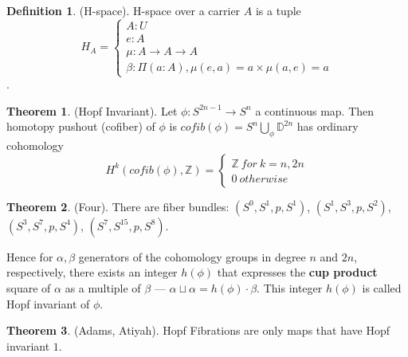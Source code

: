 \documentclass{article}
\theoremstyle{definition}
\newtheorem{definition}{Definition}
\newtheorem{theorem}{Theorem}
\begin{document}
\begin{definition} (H-space).
H-space over a carrier $A$ is a tuple
$$
H_A=
\begin{cases}
A : U\\
e : A\\
\mu : A \rightarrow A \rightarrow A\\
\beta : \Pi (a:A), \mu(e,a)=a \times \mu(a,e)=a
\end{cases}
$$.
\end{definition}

\newpage
\begin{theorem} (Hopf Invariant).
Let $\phi: S^{2n-1} \rightarrow S^{n}$ a continuous map.
Then homotopy pushout (cofiber) of $\phi$ is
$cofib(\phi) = S^{n} \bigcup_\phi \mathbb{D}^{2n}$ has
ordinary cohomology
$$
H^{k}(cofib(\phi),\mathbb{Z})=
\begin{cases}
\mathbb{Z}\ for\ k=n,2n \\[2ex]
0\ otherwise
\end{cases}
$$
\end{theorem}


\begin{theorem} (Four).
There are fiber bundles:
$(S^0,S^1,p,S^1)$,
$(S^1,S^3,p,S^2)$,
$(S^3,S^7,p,S^4)$,
$(S^7,S^{15},p,S^8)$.
\end{theorem}

Hence for $\alpha,\beta$ generators of the cohomology groups in
degree $n$ and $2n$, respectively, there exists an integer $h(\phi)$
that expresses the {\textbf{cup product}} square of $\alpha$
as a multiple of $\beta$ --- $\alpha\sqcup\alpha=h(\phi)\cdot\beta$.
This integer $h(\phi)$ is called Hopf invariant of $\phi$.

\begin{theorem} (Adams, Atiyah).
Hopf Fibrations are only maps that have Hopf invariant $1$.
\end{theorem}




\end{document}
